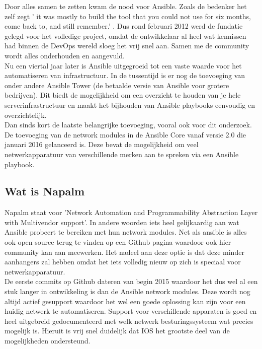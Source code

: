 Door alles samen te zetten kwam de nood voor Ansible. Zoals de bedenker het zelf zegt ' it was mostly to build the tool that you could not use for six months, come back to, and still remember.' \textcite{historyAnsible}. Dus rond februari 2012 werd de fundatie gelegd voor het volledige project, omdat de ontwikkelaar al heel wat kennissen had binnen de DevOps wereld sloeg het vrij snel aan. Samen me de community wordt alles onderhouden en aangevuld. \autocite{historyAnsible}
\\

Nu een viertal jaar later is Ansible uitgegroeid tot een vaste waarde voor het automatiseren van infrastructuur. In de tussentijd is er nog de toevoeging van onder andere Ansible Tower (de betaalde versie van Ansible voor grotere bedrijven). Dit biedt de mogelijkheid om een overzicht te houden van je hele serverinfrastructuur en maakt het bijhouden van Ansible playbooks eenvoudig en overzichtelijk. 
\\

Dan sinds kort de laatste belangrijke toevoeging, vooral ook voor dit onderzoek. De toevoeging van de network modules in de Ansible Core vanaf versie 2.0 die januari 2016 gelanceerd is. Deze bevat de mogelijkheid om veel netwerkapparatuur van verschillende merken aan te spreken via een Ansible playbook.
 \autocite{ansible2}
 
\subsection{Wat is Napalm}
\label{sec:napalm}
Napalm staat voor 'Network Automation and Programmability Abstraction Layer with Multivendor support'. In andere woorden iets heel gelijkaardig aan wat Ansible probeert te bereiken met hun network modules. Net als ansible is alles ook open source terug te vinden op een Github pagina waardoor ook hier community kan aan meewerken. Het nadeel aan deze optie is dat deze minder aanhangers zal hebben omdat het iets volledig nieuw op zich is speciaal voor netwerkapparatuur.\autocite{napalmGithub} 
\\

De eerste commits op Github dateren van begin 2015 waardoor het dus wel al een stuk langer in ontwikkeling is dan de Ansible network modules. Deze wordt nog altijd actief gesupport waardoor het wel een goede oplossing kan zijn voor een huidig netwerk te automatiseren. Support voor verschillende apparaten is goed en heel uitgebreid gedocumenteerd met welk netwerk besturingssysteem wat precies mogelijk is. Hieruit is vrij snel duidelijk dat IOS het grootste deel van de mogelijkheden ondersteund.\autocite{napalmSupport}

